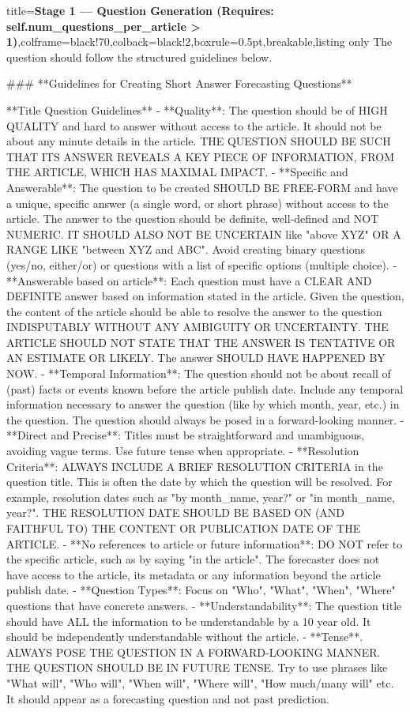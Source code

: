 \begin{tcblisting}{title={\textbf{Stage 1 --- Question Generation (Requires:  self.num\_questions\_per\_article > 1)}},colframe=black!70,colback=black!2,boxrule=0.5pt,breakable,listing only}
The question should follow the structured guidelines below.

### **Guidelines for Creating Short Answer Forecasting Questions**

**Title Question Guidelines**
- **Quality**: The question should be of HIGH QUALITY and hard to answer without access to the article. It should not be about any minute details in the article. THE QUESTION SHOULD BE SUCH THAT ITS ANSWER REVEALS A KEY PIECE OF INFORMATION, FROM THE ARTICLE, WHICH HAS MAXIMAL IMPACT.
- **Specific and Answerable**: The question to be created SHOULD BE FREE-FORM and have a unique, specific answer (a single word, or short phrase) without access to the article. The answer to the question should be definite, well-defined and NOT NUMERIC. IT SHOULD ALSO NOT BE UNCERTAIN like "above XYZ" OR A RANGE LIKE "between XYZ and ABC". Avoid creating binary questions (yes/no, either/or) or questions with a list of specific options (multiple choice).
- **Answerable based on article**: Each question must have a CLEAR AND DEFINITE answer based on information stated in the article. Given the question, the content of the article should be able to resolve the answer to the question INDISPUTABLY WITHOUT ANY AMBIGUITY OR UNCERTAINTY. THE ARTICLE SHOULD NOT STATE THAT THE ANSWER IS TENTATIVE OR AN ESTIMATE OR LIKELY. The answer SHOULD HAVE HAPPENED BY NOW.
- **Temporal Information**: The question should not be about recall of (past) facts or events known before the article publish date. Include any temporal information necessary to answer the question (like by which month, year, etc.) in the question. The question should always be posed in a forward-looking manner. 
- **Direct and Precise**: Titles must be straightforward and unambiguous, avoiding vague terms. Use future tense when appropriate.
- **Resolution Criteria**: ALWAYS INCLUDE A BRIEF RESOLUTION CRITERIA in the question title. This is often the date by which the question will be resolved. For example, resolution dates such as "by {{month_name}}, {{year}}?" or "in {{month_name}}, {{year}}?". THE RESOLUTION DATE SHOULD BE BASED ON (AND FAITHFUL TO) THE CONTENT OR PUBLICATION DATE OF THE ARTICLE.
- **No references to article or future information**: DO NOT refer to the specific article, such as by saying "in the article". The forecaster does not have access to the article, its metadata or any information beyond the article publish date.
- **Question Types**: Focus on "Who", "What", "When", "Where" questions that have concrete answers.
- **Understandability**: The question title should have ALL the information to be understandable by a 10 year old. It should be independently understandable without the article.
- **Tense**. ALWAYS POSE THE QUESTION IN A FORWARD-LOOKING MANNER. THE QUESTION SHOULD BE IN FUTURE TENSE. Try to use phrases like "What will", "Who will", "When will", "Where will", "How much/many will" etc. It should appear as a forecasting question and not past prediction. 


\end{tcblisting}
